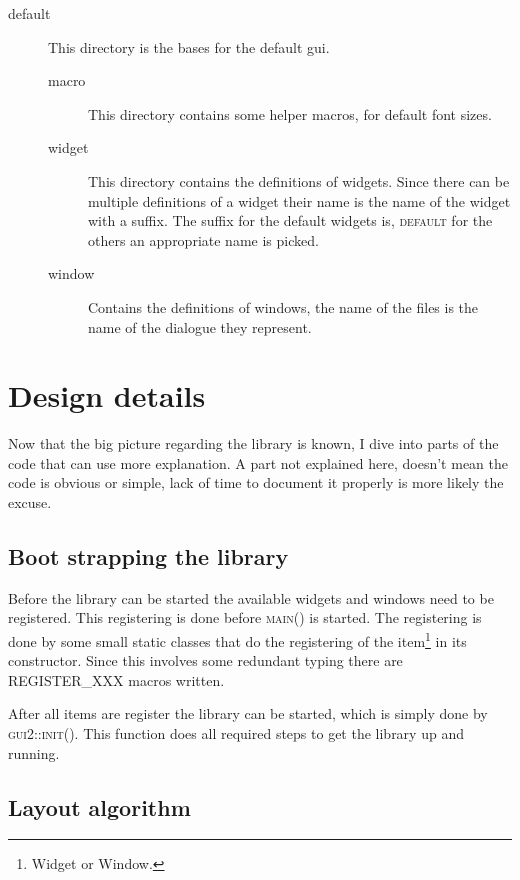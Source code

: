 \documentclass[a4paper,notitlepage]{report}
\begin{document}
\begin{description}
\begin{description}
\item[default] This directory is the bases for the default gui.

\begin{description}
\item[macro] This directory contains some helper macros, for default font sizes.
\item[widget] This directory contains the definitions of widgets. Since there
	can be multiple definitions of a widget their name is the name of the widget
	with a suffix. The suffix for the default widgets is, \textsc{default} for
	the others an appropriate name is picked.
\item[window] Contains the definitions of windows, the name of the files is the
	name of the dialogue they represent.
\end{description}

\end{description}

\end{description}


\chapter{Design details}

Now that the big picture regarding the library is known, I dive into parts of
the code that can use more explanation. A part not explained here, doesn't mean
the code is obvious or simple, lack of time to document it properly is more
likely the excuse.

\section{Boot strapping the library}

Before the library can be started the available widgets and windows need to
be registered. This registering is done before \textsc{main()} is started.
The registering is done by some small static classes that do the registering
of the item\footnote{Widget or Window.} in its constructor. Since this
involves some redundant typing there are REGISTER\_XXX macros written.

After all items are register the library can be started, which is simply
done by \textsc{gui2::init()}. This function does all required steps to get
the library up and running.

\section{Layout algorithm}
\end{document}
